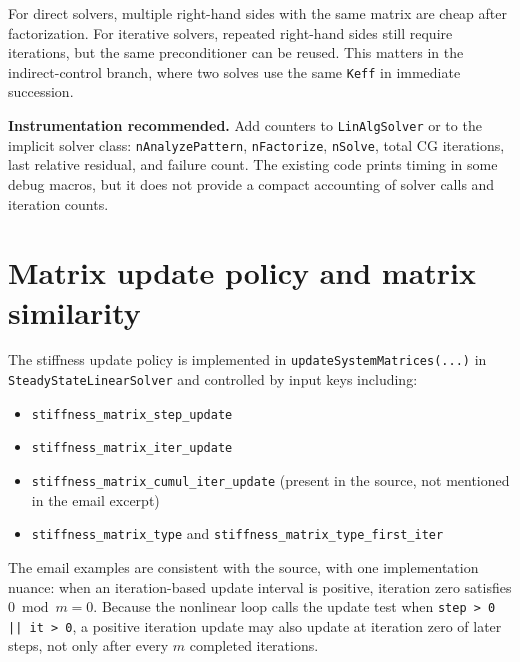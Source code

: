 \documentclass[10pt,a4paper]{article}
\newcommand{\code}[1]{\texttt{#1}}
\begin{document}
For direct solvers, multiple right-hand sides with the same matrix are cheap after factorization. For iterative solvers, repeated right-hand sides still require iterations, but the same preconditioner can be reused. This matters in the indirect-control branch, where two solves use the same \code{Keff} in immediate succession.

\textbf{Instrumentation recommended.} Add counters to \code{LinAlgSolver} or to the implicit solver class: \code{nAnalyzePattern}, \code{nFactorize}, \code{nSolve}, total CG iterations, last relative residual, and failure count. The existing code prints timing in some debug macros, but it does not provide a compact accounting of solver calls and iteration counts.

\section{Matrix update policy and matrix similarity}

The stiffness update policy is implemented in \code{updateSystemMatrices(...)} in \code{SteadyStateLinearSolver} and controlled by input keys including:
\begin{itemize}
  \item \code{stiffness\_matrix\_step\_update}
  \item \code{stiffness\_matrix\_iter\_update}
  \item \code{stiffness\_matrix\_cumul\_iter\_update} (present in the source, not mentioned in the email excerpt)
  \item \code{stiffness\_matrix\_type} and \code{stiffness\_matrix\_type\_first\_iter}
\end{itemize}

The email examples are consistent with the source, with one implementation nuance: when an iteration-based update interval is positive, iteration zero satisfies \(0 \bmod m = 0\). Because the nonlinear loop calls the update test when \code{step > 0 || it > 0}, a positive iteration update may also update at iteration zero of later steps, not only after every \(m\) completed iterations.
\end{document}
